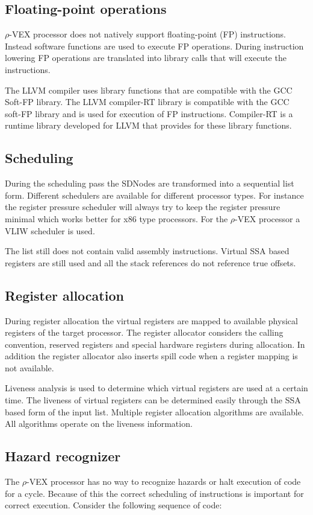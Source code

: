 \subsection{Floating-point operations}
$\rho$-VEX processor does not natively support floating-point (FP) instructions. Instead software functions are used to execute FP operations. During instruction lowering FP operations are translated into library calls that will execute the instructions.

The LLVM compiler uses library functions that are compatible with the GCC Soft-FP library. The LLVM compiler-RT library is compatible with the GCC soft-FP library and is used for execution of FP instructions. Compiler-RT is a runtime library developed for LLVM that provides for these library functions.

\subsection{Scheduling}
During the scheduling pass the SDNodes are transformed into a sequential list form. Different schedulers are available for different processor types. For instance the register pressure scheduler will always try to keep the register pressure minimal which works better for x86 type processors. For the $\rho$-VEX processor a VLIW scheduler is used.

The list still does not contain valid assembly instructions. Virtual SSA based registers are still used and all the stack references do not reference true offsets.

\subsection{Register allocation}
During register allocation the virtual registers are mapped to available physical registers of the target processor. The register allocator considers the calling convention, reserved registers and special hardware registers during allocation. In addition the register allocator also inserts spill code when a register mapping is not available.

Liveness analysis is used to determine which virtual registers are used at a certain time. The liveness of virtual registers can be determined easily through the SSA based form of the input list. Multiple register allocation algorithms are available. All algorithms operate on the liveness information.

\subsection{Hazard recognizer}
The $\rho$-VEX processor has no way to recognize hazards or halt execution of code for a cycle. Because of this the correct scheduling of instructions is important for correct execution. Consider the following sequence of code:


